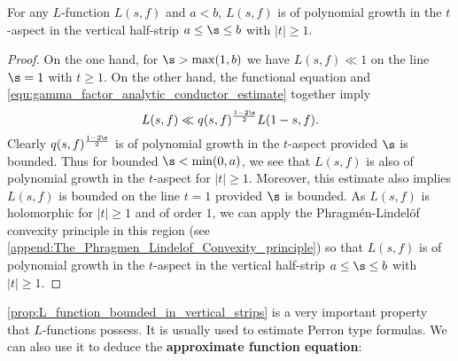     \begin{proposition}\label{prop:L_function_bounded_in_vertical_strips}
      For any $L$-function $L(s,f)$ and $a < b$, $L(s,f)$ is of polynomial growth in the $t$-aspect in the vertical half-strip $a \le \s \le b$ with $|t| \ge 1$.
    \end{proposition}
    \begin{proof}
      On the one hand, for $\s > \max(1,b)$ we have $L(s,f) \ll 1$ on the line $\s = 1$ with $t \ge 1$. On the other hand, the functional equation and \cref{equ:gamma_factor_analytic_conductor_estimate} together imply
      \[
        L(s,f) \ll q(s,f)^{\frac{1-2\s}{2}}L(1-s,f).
      \]
      Clearly $q(s,f)^{\frac{1-2\s}{2}}$ is of polynomial growth in the $t$-aspect provided $\s$ is bounded. Thus for bounded $\s < \min(0,a)$, we see that $L(s,f)$ is also of polynomial growth in the $t$-aspect for $|t| \ge 1$. Moreover, this estimate also implies $L(s,f)$ is bounded on the line $t = 1$ provided $\s$ is bounded. As $L(s,f)$ is holomorphic for $|t| \ge 1$ and of order $1$, we can apply the Phragm\'en-Lindel\"of convexity principle in this region (see \cref{append:The_Phragmen_Lindelof_Convexity_principle}) so that $L(s,f)$ is of polynomial growth in the $t$-aspect in the vertical half-strip $a \le \s \le b$ with $|t| \ge 1$.
    \end{proof}

    \cref{prop:L_function_bounded_in_vertical_strips} is a very important property that $L$-functions possess. It is usually used to estimate Perron type formulas. We can also use it to deduce the \textbf{approximate function equation}:


